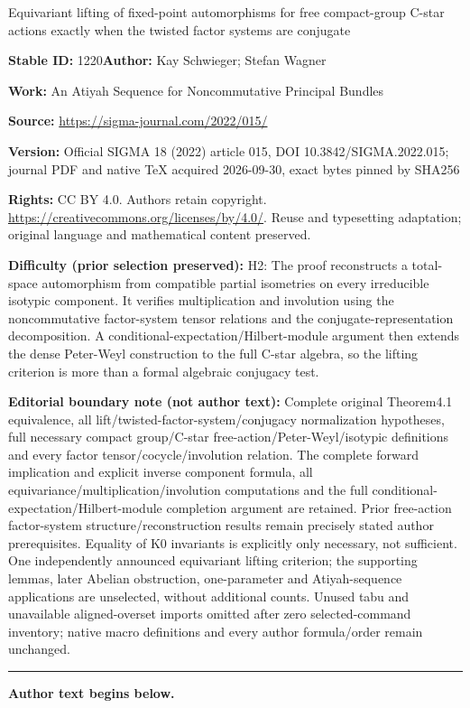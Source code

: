 \documentclass[11pt]{article}
\numberwithin{equation}{section}
\numberwithin{equation}{section}
\begin{document}
\begin{center}\Large Equivariant lifting of fixed-point automorphisms for free compact-group C-star actions exactly when the twisted factor systems are conjugate\end{center}
\noindent\textbf{Stable ID:} 1220\quad\textbf{Author:} Kay Schwieger; Stefan Wagner\par
\noindent\textbf{Work:} An Atiyah Sequence for Noncommutative Principal Bundles\par
\noindent\textbf{Source:} \url{https://sigma-journal.com/2022/015/}\par
\noindent\textbf{Version:} Official SIGMA 18 (2022) article 015, DOI 10.3842/SIGMA.2022.015; journal PDF and native TeX acquired 2026-09-30, exact bytes pinned by SHA256\par
\noindent\textbf{Rights:} CC BY 4.0. Authors retain copyright. \url{https://creativecommons.org/licenses/by/4.0/}. Reuse and typesetting adaptation; original language and mathematical content preserved.\par
\noindent\textbf{Difficulty (prior selection preserved):} {\CJKfont H2: The proof reconstructs a total-space automorphism from compatible partial isometries on every irreducible isotypic component. It verifies multiplication and involution using the noncommutative factor-system tensor relations and the conjugate-representation decomposition. A conditional-expectation/Hilbert-module argument then extends the dense Peter-Weyl construction to the full C-star algebra, so the lifting criterion is more than a formal algebraic conjugacy test.}\par
\medskip\noindent\textbf{Editorial boundary note (not author text):} Complete original Theorem4.1 equivalence, all lift/twisted-factor-system/conjugacy normalization hypotheses, full necessary compact group/C-star free-action/Peter-Weyl/isotypic definitions and every factor tensor/cocycle/involution relation. The complete forward implication and explicit inverse component formula, all equivariance/multiplication/involution computations and the full conditional-expectation/Hilbert-module completion argument are retained. Prior free-action factor-system structure/reconstruction results remain precisely stated author prerequisites. Equality of K0 invariants is explicitly only necessary, not sufficient. One independently announced equivariant lifting criterion; the supporting lemmas, later Abelian obstruction, one-parameter and Atiyah-sequence applications are unselected, without additional counts. Unused tabu and unavailable aligned-overset imports omitted after zero selected-command inventory; native macro definitions and every author formula/order remain unchanged.\par
\medskip\hrule\medskip\noindent\textbf{Author text begins below.}\par
\setcounter{section}{1}
\end{document}
